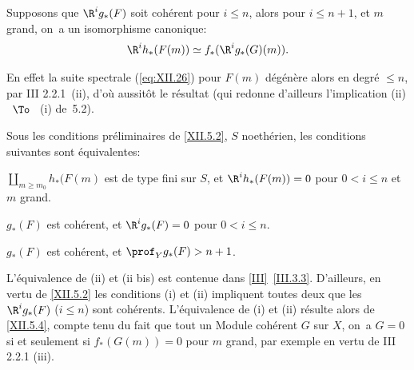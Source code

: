 \begin{corollaire} \label{XII.5.4}
Supposons que $\R^ig_\ast(F)$ soit coh\'erent pour $i\leq n$, alors pour $i\leq n+1$, et $m$ grand, on~a un isomorphisme canonique:
\[
\R^ih_\ast(F(m)) \simeq f_\ast(\R^ig_\ast(G)(m)).
\]
\end{corollaire}

En effet la suite spectrale (\ref{eq:XII.26}) pour $F(m)$ d\'eg\'en\`ere alors en degr\'e $\leq n$, par \EGA III 2.2.1~(ii), d'o\`u aussit\^{o}t le r\'esultat (qui redonne d'ailleurs l'implication (ii) ~$\To$~ (i) de~5.2).

\enlargethispage{1.2\baselineskip}%
\begin{corollaire} \label{XII.5.5}
Sous les conditions pr\'eliminaires de \ref{XII.5.2}, $S$ noeth\'erien, les conditions suivantes sont \'equivalentes:
\begin{enumeratei}
\item
$\coprod_{m\geq m_0}h_\ast(F(m)$ est de type fini sur $S$, et $\R^ih_\ast(F(m))=0$ pour $0<i\leq n$ et $m$ grand.
\item
$g_\ast(F)$ est coh\'erent, et $\R^ig_\ast(F)=0$ pour $0<i\leq n$.
\item[\textup{(ii bis)}] $g_\ast(F)$ est coh\'erent, et $\prof_Y g_\ast(F)>n+1$.
\end{enumeratei}
\end{corollaire}

L'\'equivalence de (ii) et (ii bis) est contenue dans \ref{III}~\ref{III.3.3}. D'ailleurs, en vertu de \ref{XII.5.2} les conditions (i) et (ii) impliquent toutes deux que les $\R^ig_\ast(F)$ ($i\leq n$) sont coh\'erents. L'\'equivalence de (i) et (ii) r\'esulte alors de \ref{XII.5.4}, compte tenu du fait que tout un Module coh\'erent $G$ sur $X$, on~a $G=0$ si et seulement si $f_\ast(G(m))=0$ pour $m$ grand, par exemple en vertu de \EGA III 2.2.1 (iii).

